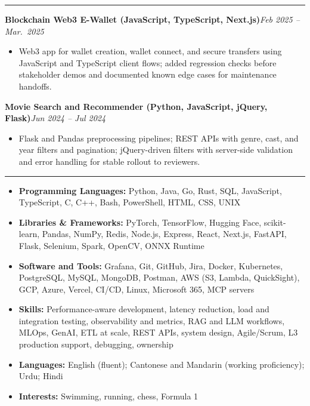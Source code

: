 \documentclass[9pt,a4paper]{article}
\newcommand{\ressection}[1]{%
  \vspace{0.8em}%
  \noindent{\large\scshape\bfseries #1}\par\nobreak
  \vspace{-\parskip}%
  \vspace{-\parskip}%
  \vspace{-\parskip}%
  \vspace{-\parskip}%
  \noindent\rule{\linewidth}{0.1pt}\par\nobreak
  \vspace{-\parskip}%
}
\newcommand{\resumeHeading}[2]{%
  \vspace{0.6em}%
  \noindent\textbf{\small #1}\hfill\textit{\small #2}\par\vspace{0.28em}}
\begin{document}
\ressection{Projects}

\resumeHeading{Blockchain Web3 E-Wallet (JavaScript, TypeScript, Next.js)}{Feb 2025 -- Mar.\ 2025}
\begin{itemize}
  \item Web3 app for wallet creation, wallet connect, and secure transfers using JavaScript and TypeScript client flows; added regression checks before stakeholder demos and documented known edge cases for maintenance handoffs.
\end{itemize}

\resumeHeading{Movie Search and Recommender (Python, JavaScript, jQuery, Flask)}{Jun 2024 -- Jul 2024}
\begin{itemize}
  \item Flask and Pandas preprocessing pipelines; REST APIs with genre, cast, and year filters and pagination; jQuery-driven filters with server-side validation and error handling for stable rollout to reviewers.
\end{itemize}

\ressection{Skills and Interests}
\begin{itemize}
  \item \textbf{Programming Languages:} Python, Java, Go, Rust, SQL, JavaScript, TypeScript, C, C++, Bash, PowerShell, HTML, CSS, UNIX
  \item \textbf{Libraries \& Frameworks:} PyTorch, TensorFlow, Hugging Face, scikit-learn, Pandas, NumPy, Redis, Node.js, Express, React, Next.js, FastAPI, Flask, Selenium, Spark, OpenCV, ONNX Runtime
  \item \textbf{Software and Tools:} Grafana, Git, GitHub, Jira, Docker, Kubernetes, PostgreSQL, MySQL, MongoDB, Postman, AWS (S3, Lambda, QuickSight), GCP, Azure, Vercel, CI/CD, Linux, Microsoft 365, MCP servers
  \item \textbf{Skills:} Performance-aware development, latency reduction, load and integration testing, observability and metrics, RAG and LLM workflows, MLOps, GenAI, ETL at scale, REST APIs, system design, Agile/Scrum, L3 production support, debugging, ownership
  \item \textbf{Languages:} English (fluent); Cantonese and Mandarin (working proficiency); Urdu; Hindi
  \item \textbf{Interests:} Swimming, running, chess, Formula 1
\end{itemize}
\end{document}
